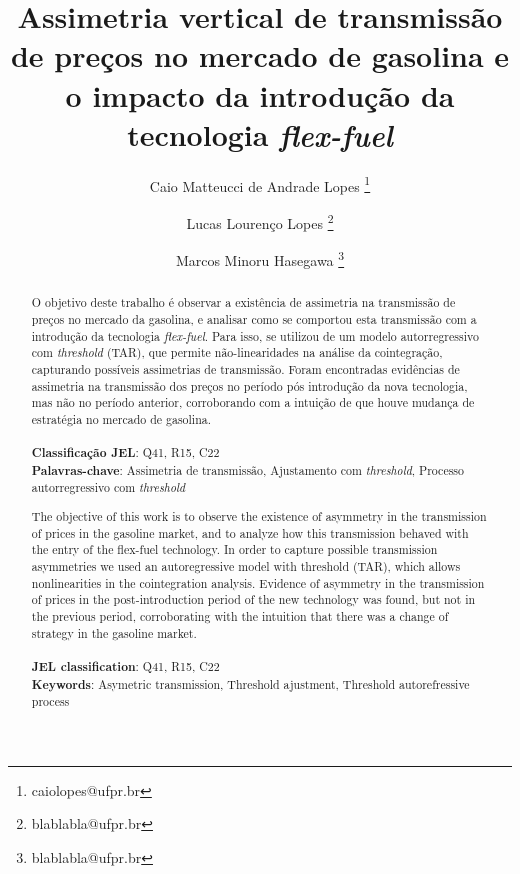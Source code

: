 \documentclass[
	article,			%
	12pt,				%
	openright,			%
	oneside,			%
	a4paper,			%
	english,			%
	brazil				%
	]{abntex2}
\date{}
\begin{document}
\title{Assimetria vertical de transmissão de preços no mercado de gasolina e o impacto da introdução da tecnologia \textit{flex-fuel}}
\author{Caio Matteucci de Andrade Lopes \thanks{caiolopes@ufpr.br} \\
  \and Lucas Lourenço Lopes \thanks{blablabla@ufpr.br} \\
  \and Marcos Minoru Hasegawa \thanks{blablabla@ufpr.br} \\
   }

\maketitle

\begin{abstract}
O objetivo deste trabalho é observar a existência de assimetria na transmissão de preços no mercado da gasolina, e analisar como se comportou esta transmissão com a introdução da tecnologia \textit{flex-fuel}. Para isso, se utilizou de um modelo autorregressivo com \textit{threshold} (TAR), que permite não-linearidades na análise da cointegração, capturando possíveis assimetrias de transmissão. Foram encontradas evidências de assimetria na transmissão dos preços no período pós introdução da nova tecnologia, mas não no período anterior, corroborando com a intuição de que houve mudança de estratégia no mercado de gasolina.    \\ \\
\textbf{Classificação JEL}: Q41, R15, C22 \\
\textbf {Palavras-chave}: Assimetria de transmissão, Ajustamento com \textit{threshold}, Processo autorregressivo com \textit{threshold}
\end{abstract}



\begin{abstract}

The objective of this work is to observe the existence of asymmetry in the transmission of prices in the gasoline market, and to analyze how this transmission behaved with the entry of the flex-fuel technology. In order to capture possible transmission asymmetries we used an autoregressive model with threshold (TAR), which allows nonlinearities in the cointegration analysis. Evidence of asymmetry in the transmission of prices in the post-introduction period of the new technology was found, but not in the previous period, corroborating with the intuition that there was a change of strategy in the gasoline market. \\ \\
\textbf{JEL classification}: Q41, R15, C22 \\
\textbf {Keywords}: Asymetric transmission, Threshold ajustment, Threshold autorefressive process

\end{abstract}
\end{document}
